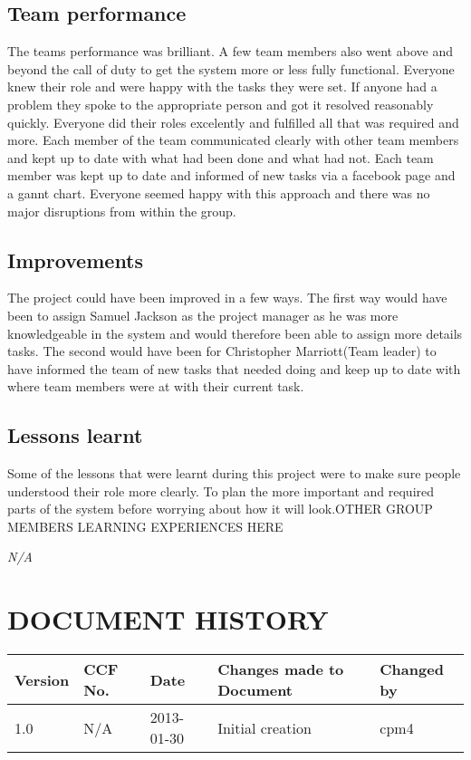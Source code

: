 \documentclass{project}
\begin{document}
\subsection{Team performance}
The teams performance was brilliant. A few team members also went above and beyond the call of duty to get the system more or less fully functional. Everyone knew their role and were happy with the tasks they were set. If anyone had a problem they spoke to the appropriate person and got it resolved reasonably quickly. Everyone did their roles excelently and fulfilled all that was required and more. Each member of the team communicated clearly with other team members and kept up to date with what had been done and what had not. Each team member was kept up to date and informed of new tasks via a facebook page and a gannt chart. Everyone seemed happy with this approach and there was no major disruptions from within the group.

\subsection{Improvements}
The project could have been improved in a few ways. The first way would have been to assign Samuel Jackson as the project manager as he was more knowledgeable in the system and would therefore been able to assign more details tasks. The second would have been for Christopher Marriott(Team leader) to have informed the team of new tasks that needed doing and keep up to date with where team members were at with their current task.

\subsection{Lessons learnt}
Some of the lessons that were learnt during this project were to make sure people understood their role more clearly. To plan the more important and required parts of the system before worrying about how it will look.OTHER GROUP MEMBERS LEARNING EXPERIENCES HERE

\clearpage
{}
\begin{thebibliography}{5}
\bibitem{} \emph{N/A}
\end{thebibliography}
\clearpage
{}
\section*{DOCUMENT HISTORY}
\begin{tabular}{|l | l | l | l | l |}
\hline
Version & CCF No. & Date & Changes made to Document & Changed by \\
\hline
1.0 & N/A & 2013-01-30 & Initial creation & cpm4 \\
\hline
\end{tabular}
\label{thelastpage}
\end{document}
